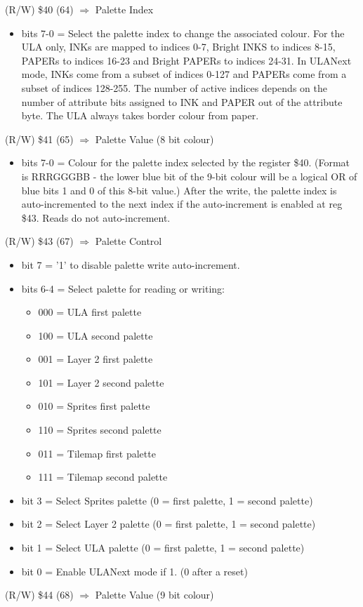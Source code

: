 (R/W) \$40 (64) $\Rightarrow$ Palette Index
\begin{itemize}
\item bits 7-0 = Select the palette index to change the associated colour.
For the ULA only, INKs are mapped to indices 0-7, Bright INKS to
indices 8-15, PAPERs to indices 16-23 and Bright PAPERs to indices
24-31.  In ULANext mode, INKs come from a subset of indices 0-127 and
PAPERs come from a subset of indices 128-255.  The number of active
indices depends on the number of attribute bits assigned to INK and
PAPER out of the attribute byte.  The ULA always takes border colour
from paper.
\end{itemize}
(R/W) \$41 (65) $\Rightarrow$ Palette Value (8 bit colour)
\begin{itemize}
\item bits 7-0 = Colour for the palette index selected by the register \$40.
(Format is RRRGGGBB - the lower blue bit of the 9-bit colour will be a
logical OR of blue bits 1 and 0 of this 8-bit value.)  After the
write, the palette index is auto-incremented to the next index if the
auto-increment is enabled at reg \$43.  Reads do not auto-increment.
\end{itemize}
(R/W) \$43 (67) $\Rightarrow$ Palette Control
\begin{itemize}
\item bit 7 = '1' to disable palette write auto-increment.
\item bits 6-4 = Select palette for reading or writing:
  \begin{itemize}
  \item 000 = ULA first palette
  \item 100 = ULA second palette
  \item 001 = Layer 2 first palette
  \item 101 = Layer 2 second palette
  \item 010 = Sprites first palette 
  \item 110 = Sprites second palette
  \item 011 = Tilemap first palette
  \item 111 = Tilemap second palette
  \end{itemize}
\item bit 3 = Select Sprites palette (0 = first palette, 1 = second palette)
\item bit 2 = Select Layer 2 palette (0 = first palette, 1 = second palette)
\item bit 1 = Select ULA palette (0 = first palette, 1 = second palette)
\item bit 0 = Enable ULANext mode if 1. (0 after a reset)
\end{itemize}
(R/W) \$44 (68) $\Rightarrow$ Palette Value (9 bit colour)

